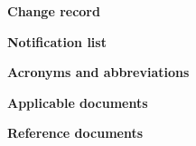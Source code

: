 \small
\cvsID
\normalsize

\pagebreak



\begin{center}
\Large
{\bf Change record\\ \vspace{1cm}}
\normalsize
\daspchangerecord
\end{center}
\vspace{2cm}

\begin{center}
\Large
{\bf Notification list\\ \vspace{1cm}}
\normalsize
\daspnotificationlist
\end{center}

\pagebreak

\begin{center}
\Large
{\bf Acronyms and abbreviations\\ \vspace{1cm}}
\normalsize
\daspabbreviations
\end{center}

\pagebreak

\begin{center}
\Large
{\bf Applicable documents\\ \vspace{1cm}}
\normalsize

\daspapplicabledocs
\end{center}
\vspace{2cm}

\begin{center}
\Large
{\bf Reference documents \\ \vspace{1cm}}
\normalsize

\dasprefdocs
\end{center}

\pagebreak
\tableofcontents
\pagebreak
